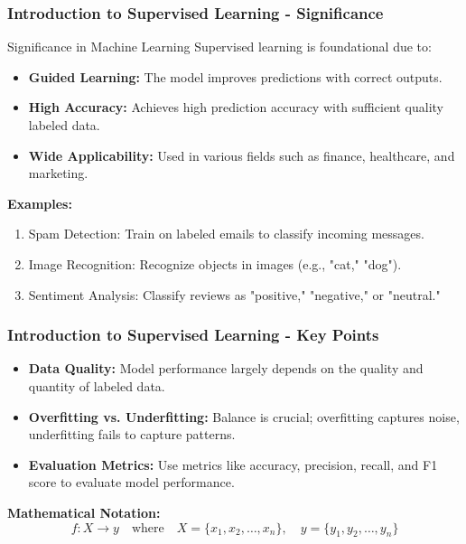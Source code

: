 \documentclass[aspectratio=169]{beamer}
\begin{document}
\begin{frame}[fragile]
    \frametitle{Introduction to Supervised Learning - Significance}
    \begin{block}{Significance in Machine Learning}
        Supervised learning is foundational due to:
        \begin{itemize}
            \item \textbf{Guided Learning:} The model improves predictions with correct outputs.
            \item \textbf{High Accuracy:} Achieves high prediction accuracy with sufficient quality labeled data.
            \item \textbf{Wide Applicability:} Used in various fields such as finance, healthcare, and marketing.
        \end{itemize}
    \end{block}
    
    \textbf{Examples:}
    \begin{enumerate}
        \item Spam Detection: Train on labeled emails to classify incoming messages.
        \item Image Recognition: Recognize objects in images (e.g., "cat," "dog").
        \item Sentiment Analysis: Classify reviews as "positive," "negative," or "neutral."
    \end{enumerate}
\end{frame}

\begin{frame}[fragile]
    \frametitle{Introduction to Supervised Learning - Key Points}
    \begin{itemize}
        \item \textbf{Data Quality:} Model performance largely depends on the quality and quantity of labeled data.
        \item \textbf{Overfitting vs. Underfitting:} Balance is crucial; overfitting captures noise, underfitting fails to capture patterns.
        \item \textbf{Evaluation Metrics:} Use metrics like accuracy, precision, recall, and F1 score to evaluate model performance.
    \end{itemize}

    \textbf{Mathematical Notation:}
    \begin{equation}
        f: X \to y \quad \text{where} \quad X = \{x_1, x_2, \ldots, x_n\}, \quad y = \{y_1, y_2, \ldots, y_n\}
    \end{equation}
\end{frame}
\end{document}
